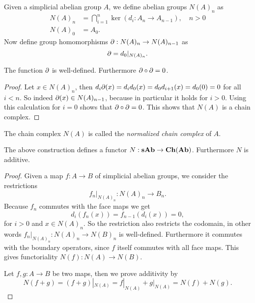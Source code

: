 Given a simplicial abelian group $A$, we define abelian groups $N(A)_n$ as
\begin{align*}
	N(A)_n &= \bigcap_{i=1}^{n} \ker(d_i: A_n \to A_{n-1}), \quad n > 0 \\
	N(A)_0 &= A_0.
\end{align*}
Now define group homomorphisms $\partial: N(A)_n \to N(A)_{n-1}$ as
$$ \partial = d_0|_{N(A)_n}. $$
\begin{lemma}
	The function $ \partial $ is well-defined. Furthermore $ \partial \circ \partial = 0 $.
\end{lemma}
\begin{proof}
	Let $x \in N(A)_n$, then $d_i \partial(x) = d_i d_0(x) = d_0 d_{i+1}(x) = d_0 (0) = 0$ for all $i < n$. So indeed $\partial(x) \in N(A)_{n-1}$, because in particular it holds for $i > 0$. Using this calculation for $i = 0$ shows that $\partial \circ \partial = 0$. This shows that $N(A)$ is a chain complex.
\end{proof}

The chain complex $N(A)$ is called the \emph{normalized chain complex} of $A$.
\begin{lemma}
	The above construction defines a functor $N: \mathbf{sAb} \to \mathbf{Ch}(\mathbf{Ab})$. Furthermore $N$ is additive.
\end{lemma}
\begin{proof}
	Given a map $f: A \to B$ of simplicial abelian groups, we consider the restrictions
	$$ f_n |_{N(A)_n}: N(A)_n \to B_n. $$
	Because $f_n$ commutes with the face maps we get
	$$ d_i(f_n(x)) = f_{n-1}(d_i(x)) = 0, $$
	for $i>0$ and $x \in N(A)_n$. So the restriction also restricts the codomain, in other words $f_n |_{N(A)_n}: N(A)_n \to N(B)_n$ is well-defined. Furthermore it commutes with the boundary operators, since $f$ itself commutes with all face maps. This gives functoriality $N(f): N(A) \to N(B)$.

	Let $f, g: A \to B$ be two maps, then we prove additivity by
	$$ N(f+g) = (f+g)|_{N(A)} = f|_{N(A)} + g|_{N(A)} = N(f) + N(g). $$
\end{proof}

